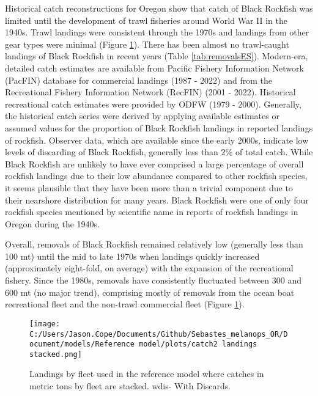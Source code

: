\documentclass[11pt,
  english,
  letterpaper,
]{article}
\begin{document}
Historical catch reconstructions for Oregon show that catch of Black Rockfish was limited until the development of trawl fisheries around World War II in the 1940s. Trawl landings were consistent through the 1970s and landings from other gear types were minimal (Figure \ref{fig:es-catch}). There has been almost no trawl-caught landings of Black Rockfish in recent years (Table \ref{tab:removalsES}). Modern-era, detailed catch estimates are available from Pacific Fishery Information Network (PacFIN) database for commercial landings (1987 - 2022) and from the Recreational Fishery Information Network (RecFIN) (2001 - 2022). Historical recreational catch estimates were provided by ODFW (1979 - 2000). Generally, the historical catch series were derived by applying available estimates or assumed values for the proportion of Black Rockfish landings in reported landings of rockfish. Observer data, which are available since the early 2000s, indicate low levels of discarding of Black Rockfish, generally less than 2\% of total catch. While Black Rockfish are unlikely to have ever comprised a large percentage of overall rockfish landings due to their low abundance compared to other rockfish species, it seems plausible that they have been more than a trivial component due to their nearshore distribution for many years. Black Rockfish were one of only four rockfish species mentioned by scientific name in reports of rockfish landings in Oregon during the 1940s.

Overall, removals of Black Rockfish remained relatively low (generally less than 100 mt) until the mid to late 1970s when landings quickly increased (approximately eight-fold, on average) with the expansion of the recreational fishery. Since the 1980s, removals have consistently fluctuated between 300 and 600 mt (no major trend), comprising mostly of removals from the ocean boat recreational fleet and the non-trawl commercial fleet (Figure \ref{fig:es-catch}).



\begin{figure}
\centering
\texttt{[image: C:/Users/Jason.Cope/Documents/Github/Sebastes\_melanops\_OR/Document/models/Reference model/plots/catch2 landings stacked.png]}
\caption{Landings by fleet used in the reference model where catches in metric tons by fleet are stacked. wdis- With Discards.\label{fig:es-catch}}
\end{figure}

\clearpage
\end{document}
